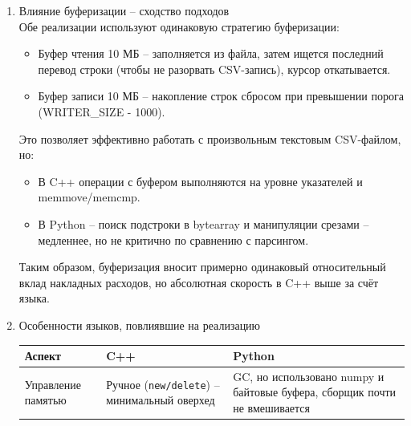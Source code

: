 \documentclass[oneside,a4paper,14pt]{extarticle} %
\begin{document}
\begin{enumerate}
\begin{enumerate}
\begin{itemize}
				\item Работа с приоритетной очередью \\
				C++: priority\_queue с элементами-структурами, операции сравнения – без аллокаций. \\
				Python: heapq работает с объектами MergeNode. Создание объекта, извлечение ключа, сравнение – накладные расходы на динамическую типизацию.
				\item Отсутствие JIT-компиляции \\
				CPython интерпретирует байт-код, каждый цикл и вызов функции имеют существенные издержки.
				Даже оптимизированный код на Python остаётся медленнее C++ в задачах обработки больших объёмов данных.
			\end{itemize}
		\end{enumerate}
		\newpage
		\item Влияние буферизации – сходство подходов \\
		Обе реализации используют одинаковую стратегию буферизации: \begin{itemize}
			\item Буфер чтения 10 МБ – заполняется из файла, затем ищется последний перевод строки (чтобы не разорвать CSV-запись), курсор откатывается.
			\item Буфер записи 10 МБ – накопление строк сбросом при превышении порога (WRITER\_SIZE - 1000).
		\end{itemize}
		Это позволяет эффективно работать с произвольным текстовым CSV-файлом, но: \begin{itemize}
			\item В C++ операции с буфером выполняются на уровне указателей и memmove/memcmp.
			\item В Python – поиск подстроки в bytearray и манипуляции срезами – медленнее, но не критично по сравнению с парсингом.
		\end{itemize}
		Таким образом, буферизация вносит примерно одинаковый относительный вклад накладных расходов, но абсолютная скорость в C++ выше за счёт языка.
		\newpage
		\item Особенности языков, повлиявшие на реализацию \\
		\begin{table}[htbp]
			\centering
			\begin{tabular}{|p{4cm}|p{6cm}|p{6cm}|}
			\hline
			\textbf{Аспект} & \textbf{C++} & \textbf{Python} \\
			\hline
			Управление памятью & Ручное (\texttt{new/delete}) – минимальный оверхед & GC, но использовано numpy и байтовые буфера, сборщик почти не вмешивается \\

\end{tabular}
\end{table}
\end{enumerate}
\end{document}
